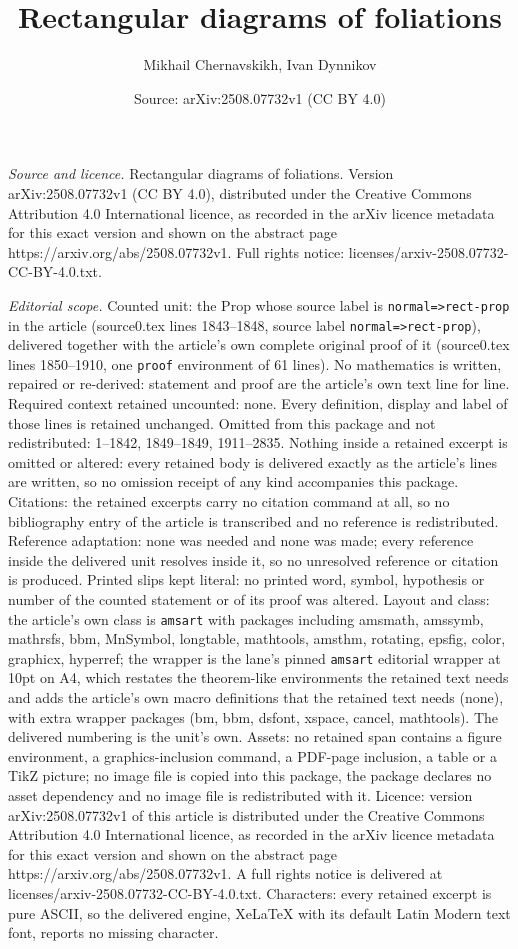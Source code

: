 \documentclass[10pt,a4paper]{amsart}
\title[Rectangular diagrams of foliations]{Rectangular diagrams of foliations}
\author{Mikhail Chernavskikh, Ivan Dynnikov}
\date{Source: arXiv:2508.07732v1 (CC BY 4.0)}
\begin{document}
\maketitle

\noindent\emph{Source and licence.} Rectangular diagrams of foliations. Version arXiv:2508.07732v1 (CC BY 4.0), distributed under the Creative Commons Attribution 4.0 International licence, as recorded in the arXiv licence metadata for this exact version and shown on the abstract page https://arxiv.org/abs/2508.07732v1. Full rights notice: licenses/arxiv-2508.07732-CC-BY-4.0.txt.\par\smallskip

\noindent\textit{Editorial scope.} Counted unit: the Prop whose source label is \texttt{normal=>rect-prop} in the article (source0.tex lines 1843--1848, source label \texttt{normal=>rect-prop}), delivered together with the article's own complete original proof of it (source0.tex lines 1850--1910, one \texttt{proof} environment of 61 lines). No mathematics is written, repaired or re-derived: statement and proof are the article's own text line for line. Required context retained uncounted: none. Every definition, display and label of those lines is retained unchanged. Omitted from this package and not redistributed: 1--1842, 1849--1849, 1911--2835. Nothing inside a retained excerpt is omitted or altered: every retained body is delivered exactly as the article's lines are written, so no omission receipt of any kind accompanies this package. Citations: the retained excerpts carry no citation command at all, so no bibliography entry of the article is transcribed and no reference is redistributed. Reference adaptation: none was needed and none was made; every reference inside the delivered unit resolves inside it, so no unresolved reference or citation is produced. Printed slips kept literal: no printed word, symbol, hypothesis or number of the counted statement or of its proof was altered. Layout and class: the article's own class is \texttt{amsart} with packages including amsmath, amssymb, mathrsfs, bbm, MnSymbol, longtable, mathtools, amsthm, rotating, epsfig, color, graphicx, hyperref; the wrapper is the lane's pinned \texttt{amsart} editorial wrapper at 10pt on A4, which restates the theorem-like environments the retained text needs and adds the article's own macro definitions that the retained text needs (none), with extra wrapper packages (bm, bbm, dsfont, xspace, cancel, mathtools). The delivered numbering is the unit's own. Assets: no retained span contains a figure environment, a graphics-inclusion command, a PDF-page inclusion, a table or a TikZ picture; no image file is copied into this package, the package declares no asset dependency and no image file is redistributed with it. Licence: version arXiv:2508.07732v1 of this article is distributed under the Creative Commons Attribution 4.0 International licence, as recorded in the arXiv licence metadata for this exact version and shown on the abstract page https://arxiv.org/abs/2508.07732v1. A full rights notice is delivered at licenses/arxiv-2508.07732-CC-BY-4.0.txt. Characters: every retained excerpt is pure ASCII, so the delivered engine, XeLaTeX with its default Latin Modern text font, reports no missing character.
\end{document}
